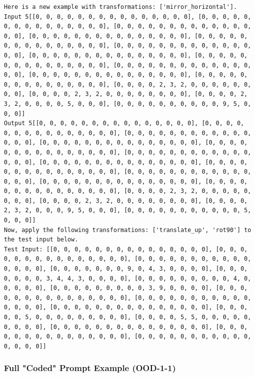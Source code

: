 \begin{lstlisting}
Here is a new example with transformations: ['mirror_horizontal'].
Input 5[[0, 0, 0, 0, 0, 0, 0, 0, 0, 0, 0, 0, 0, 0, 0], [0, 0, 0, 0, 0, 0, 0, 0, 0, 0, 0, 0, 0, 0, 0], [0, 0, 0, 0, 0, 0, 0, 0, 0, 0, 0, 0, 0, 0, 0], [0, 0, 0, 0, 0, 0, 0, 0, 0, 0, 0, 0, 0, 0, 0], [0, 0, 0, 0, 0, 0, 0, 0, 0, 0, 0, 0, 0, 0, 0], [0, 0, 0, 0, 0, 0, 0, 0, 0, 0, 0, 0, 0, 0, 0], [0, 0, 0, 0, 0, 0, 0, 0, 0, 0, 0, 0, 0, 0, 0], [0, 0, 0, 0, 0, 0, 0, 0, 0, 0, 0, 0, 0, 0, 0], [0, 0, 0, 0, 0, 0, 0, 0, 0, 0, 0, 0, 0, 0, 0], [0, 0, 0, 0, 0, 0, 0, 0, 0, 0, 0, 0, 0, 0, 0], [0, 0, 0, 0, 0, 0, 0, 0, 0, 0, 0, 0, 0, 0, 0], [0, 0, 0, 0, 2, 3, 2, 0, 0, 0, 0, 0, 0, 0, 0], [0, 0, 0, 0, 2, 3, 2, 0, 0, 0, 0, 0, 0, 0, 0], [0, 0, 0, 0, 2, 3, 2, 0, 0, 0, 0, 5, 0, 0, 0], [0, 0, 0, 0, 0, 0, 0, 0, 0, 0, 9, 5, 0, 0, 0]]
Output 5[[0, 0, 0, 0, 0, 0, 0, 0, 0, 0, 0, 0, 0, 0, 0], [0, 0, 0, 0, 0, 0, 0, 0, 0, 0, 0, 0, 0, 0, 0], [0, 0, 0, 0, 0, 0, 0, 0, 0, 0, 0, 0, 0, 0, 0], [0, 0, 0, 0, 0, 0, 0, 0, 0, 0, 0, 0, 0, 0, 0], [0, 0, 0, 0, 0, 0, 0, 0, 0, 0, 0, 0, 0, 0, 0], [0, 0, 0, 0, 0, 0, 0, 0, 0, 0, 0, 0, 0, 0, 0], [0, 0, 0, 0, 0, 0, 0, 0, 0, 0, 0, 0, 0, 0, 0], [0, 0, 0, 0, 0, 0, 0, 0, 0, 0, 0, 0, 0, 0, 0], [0, 0, 0, 0, 0, 0, 0, 0, 0, 0, 0, 0, 0, 0, 0], [0, 0, 0, 0, 0, 0, 0, 0, 0, 0, 0, 0, 0, 0, 0], [0, 0, 0, 0, 0, 0, 0, 0, 0, 0, 0, 0, 0, 0, 0], [0, 0, 0, 0, 2, 3, 2, 0, 0, 0, 0, 0, 0, 0, 0], [0, 0, 0, 0, 2, 3, 2, 0, 0, 0, 0, 0, 0, 0, 0], [0, 0, 0, 0, 2, 3, 2, 0, 0, 0, 9, 5, 0, 0, 0], [0, 0, 0, 0, 0, 0, 0, 0, 0, 0, 0, 5, 0, 0, 0]]
Now, apply the following transformations: ['translate_up', 'rot90'] to the test input below.
Test Input: [[0, 0, 0, 0, 0, 0, 0, 0, 0, 0, 0, 0, 0, 0, 0], [0, 0, 0, 0, 0, 0, 0, 0, 0, 0, 0, 0, 0, 0, 0], [0, 0, 0, 0, 0, 0, 0, 0, 0, 0, 0, 0, 0, 0, 0], [0, 0, 0, 0, 0, 0, 0, 9, 0, 4, 3, 0, 0, 0, 0], [0, 0, 0, 0, 0, 0, 0, 3, 4, 4, 3, 0, 0, 0, 0], [0, 0, 0, 0, 0, 0, 0, 0, 0, 4, 0, 0, 0, 0, 0], [0, 0, 0, 0, 0, 0, 0, 0, 0, 3, 9, 0, 0, 0, 0], [0, 0, 0, 0, 0, 0, 0, 0, 0, 0, 0, 0, 0, 0, 0], [0, 0, 0, 0, 0, 0, 0, 0, 0, 0, 0, 0, 0, 0, 0], [0, 0, 0, 0, 0, 0, 0, 0, 0, 0, 0, 0, 0, 0, 0], [0, 0, 0, 0, 0, 5, 0, 0, 0, 0, 0, 0, 0, 0, 0], [0, 0, 0, 0, 5, 5, 0, 0, 0, 0, 0, 0, 0, 0, 0], [0, 0, 0, 0, 0, 0, 0, 0, 0, 0, 0, 0, 0, 0, 0], [0, 0, 0, 0, 0, 0, 0, 0, 0, 0, 0, 0, 0, 0, 0], [0, 0, 0, 0, 0, 0, 0, 0, 0, 0, 0, 0, 0, 0, 0]]
\end{lstlisting}

\subsubsection{Full "Coded" Prompt Example (OOD-1-1)}

